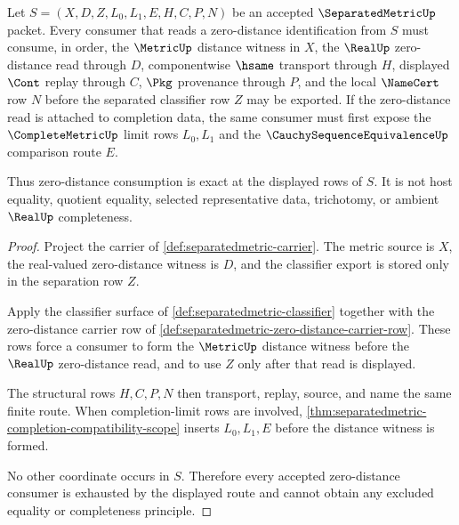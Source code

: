 \begin{theorem}
\label{thm:separatedmetric-zero-distance-consumer-exactness}
Let $S=(X,D,Z,L_0,L_1,E,H,C,P,N)$ be an accepted $\SeparatedMetricUp$ packet. Every consumer that reads a zero-distance identification from $S$ must consume, in order, the $\MetricUp$ distance witness in $X$, the $\RealUp$ zero-distance read through $D$, componentwise $\hsame$ transport through $H$, displayed $\Cont$ replay through $C$, $\Pkg$ provenance through $P$, and the local $\NameCert$ row $N$ before the separated classifier row $Z$ may be exported. If the zero-distance read is attached to completion data, the same consumer must first expose the $\CompleteMetricUp$ limit rows $L_0,L_1$ and the $\CauchySequenceEquivalenceUp$ comparison route $E$.

Thus zero-distance consumption is exact at the displayed rows of $S$. It is not host equality, quotient equality, selected representative data, trichotomy, or ambient $\RealUp$ completeness.
\end{theorem}
\begin{proof}
Project the carrier of \autoref{def:separatedmetric-carrier}. The metric source is $X$, the real-valued zero-distance witness is $D$, and the classifier export is stored only in the separation row $Z$.

Apply the classifier surface of \autoref{def:separatedmetric-classifier} together with the zero-distance carrier row of \autoref{def:separatedmetric-zero-distance-carrier-row}. These rows force a consumer to form the $\MetricUp$ distance witness before the $\RealUp$ zero-distance read, and to use $Z$ only after that read is displayed.

The structural rows $H,C,P,N$ then transport, replay, source, and name the same finite route. When completion-limit rows are involved, \autoref{thm:separatedmetric-completion-compatibility-scope} inserts $L_0,L_1,E$ before the distance witness is formed.

No other coordinate occurs in $S$. Therefore every accepted zero-distance consumer is exhausted by the displayed route and cannot obtain any excluded equality or completeness principle.
\end{proof}

